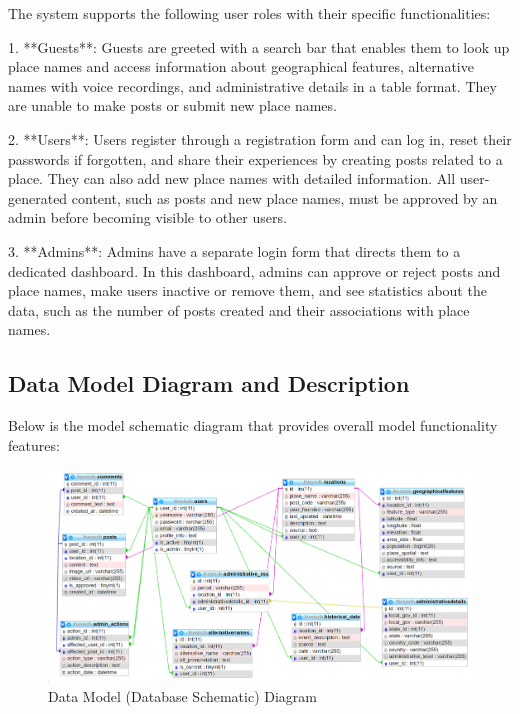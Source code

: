 The system supports the following user roles with their specific functionalities:

1. **Guests**: Guests are greeted with a search bar that enables them to look up place names and access information about geographical features, alternative names with voice recordings, and administrative details in a table format. They are unable to make posts or submit new place names.

2. **Users**: Users register through a registration form and can log in, reset their passwords if forgotten, and share their experiences by creating posts related to a place. They can also add new place names with detailed information. All user-generated content, such as posts and new place names, must be approved by an admin before becoming visible to other users.

3. **Admins**: Admins have a separate login form that directs them to a dedicated dashboard. In this dashboard, admins can approve or reject posts and place names, make users inactive or remove them, and see statistics about the data, such as the number of posts created and their associations with place names.


\subsection{Data Model Diagram and Description}
Below is the model schematic diagram that provides overall model functionality features:

\begin{figure}[H]
    \centering
    \includegraphics[width=1\linewidth]{model_schema.png}
    \caption{Data Model (Database Schematic) Diagram}
    \label{fig:enter-label}
\end{figure}

